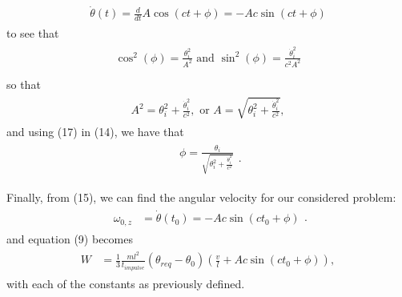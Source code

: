     \begin{eqnarray}
    \begin{split}
        \dot\theta(t)=\frac{d}{dt}A\cos(ct+\phi)=-Ac\sin(ct+\phi)
    \end{split}
    \end{eqnarray}
    to see that
    \begin{eqnarray}
    \begin{split}
        \cos^{2}(\phi) = \frac{\theta_{i}^{2}}{A^{2}} \text{ and }
        \sin^{2}(\phi)=\frac{\dot\theta_{i}^{2}}{c^{2}A^{2}}
    \end{split}\\
    \end{eqnarray}
    so that
    \begin{eqnarray}
    \begin{split}
        A^{2}=\theta_{i}^{2}+\frac{\dot\theta_{i}^{2}}{c^{2}}, \text{ or }
        A=\sqrt{\theta_{i}^{2}+\frac{\dot\theta_{i}^{2}}{c^{2}}},
    \end{split}
    \end{eqnarray}
    and using (17) in (14), we have that 
    \begin{eqnarray}
    \begin{split}
        \phi=\frac{\theta_{i}}{\sqrt{\theta_{i}^{2}+\frac{\dot\theta_{i}^{2}}{c^{2}}}}
    \end{split}.
    \end{eqnarray}\par
    Finally, from (15), we can find the angular velocity for our considered problem:
    \begin{eqnarray}
    \begin{split}
        \omega_{0,z} & = \dot\theta(t_{0})=-Ac\sin (ct_{0}+\phi)
    \end{split}.
    \end{eqnarray}
    and equation (9) becomes
    \begin{eqnarray}
    \begin{split}
        W & =\frac{1}{3}\frac{ml^{2}}{t_{impulse}}(\theta_{req}-\theta_{0}) (\frac{v}{l}+Ac\sin(ct_{0}+\phi)),
    \end{split}
    \end{eqnarray}
    with each of the constants as previously defined. \\
